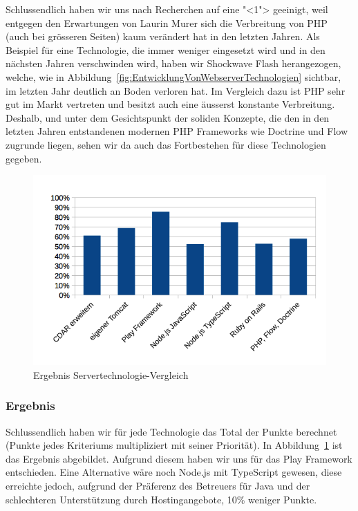 			Schlussendlich haben wir uns nach Recherchen auf eine "<1"> geeinigt, weil entgegen den Erwartungen von Laurin Murer sich die Verbreitung von PHP (auch bei grösseren Seiten) kaum verändert hat in den letzten Jahren.
			Als Beispiel für eine Technologie, die immer weniger eingesetzt wird und in den nächsten Jahren verschwinden wird, haben wir Shockwave Flash herangezogen, welche, wie in Abbildung~\ref{fig:EntwicklungVonWebserverTechnologien} sichtbar, im letzten Jahr deutlich an Boden verloren hat.
			Im Vergleich dazu ist PHP sehr gut im Markt vertreten und besitzt auch eine äusserst konstante Verbreitung.
			Deshalb, und unter dem Gesichtspunkt der soliden Konzepte, 
			die den in den letzten Jahren entstandenen modernen PHP Frameworks wie Doctrine und Flow zugrunde liegen, sehen wir da auch das Fortbestehen für diese Technologien gegeben.
			
			\begin{figure}[H]
				\begin{minipage}[b]{\linewidth}
					\includegraphics[width=\textwidth]{media/spreadsheets/ServertechnologieVergleichVergleichDerTechnologienDiagramm.png}
					\centering
					\caption{Ergebnis Servertechnologie-Vergleich}
					\label{fig:ErgebnisServertechnologieVergleich}
				\end{minipage}
			\end{figure}
		
		
		\subsubsection{Ergebnis}
			\label{serverEvaluationErgebnis}				
			
			Schlussendlich haben wir für jede Technologie das Total der Punkte berechnet (Punkte jedes Kriteriums multipliziert mit seiner Priorität).
			In Abbildung~\ref{fig:ErgebnisServertechnologieVergleich} ist das Ergebnis abgebildet.
			Aufgrund diesem haben wir uns für das Play Framework entschieden.
			Eine Alternative wäre noch Node.js mit TypeScript gewesen, diese erreichte jedoch, aufgrund der Präferenz des Betreuers für Java und der schlechteren Unterstützung durch Hostingangebote, 10\% weniger Punkte.
			
